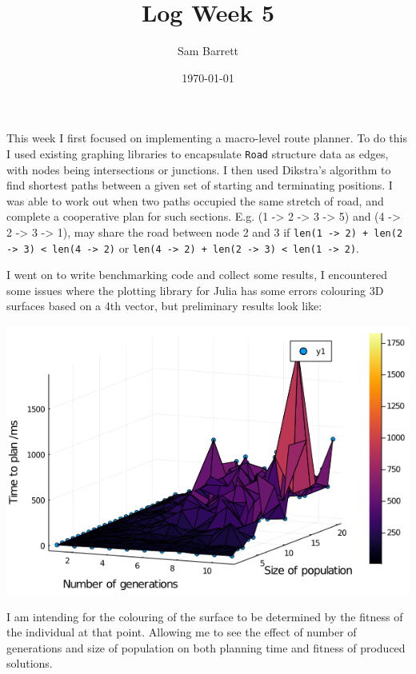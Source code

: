 \documentclass[11pt]{article}
\author{Sam Barrett}
\date{\today}
\title{Log Week 5}
\begin{document}
\maketitle
This week I first focused on implementing a macro-level route planner. To do this I used existing graphing libraries to encapsulate \texttt{Road} structure data as edges, with nodes being intersections or junctions. I then used Dikstra's algorithm to find shortest paths between a given set of starting and terminating positions. I was able to work out when two paths occupied the same stretch of road, and complete a cooperative plan for such sections. E.g. (1 -> 2 -> 3 -> 5) and (4 -> 2 -> 3 -> 1), may share the road between node 2 and 3 if \texttt{len(1 -> 2) + len(2 -> 3) < len(4 -> 2)} or \texttt{len(4 -> 2) + len(2 -> 3) < len(1 -> 2)}.

I went on to write benchmarking code and collect some results, I encountered some issues where the plotting library for Julia has some errors colouring 3D surfaces based on a 4th vector, but preliminary results look like:

\begin{center}
\includegraphics[width=.9\linewidth]{../../code/julia/images/single-agent-result.png}
\end{center}


I am intending for the colouring of the surface to be determined by the fitness of the individual at that point. Allowing me to see the effect of number of generations and size of population on both planning time and fitness of produced solutions.
\end{document}
